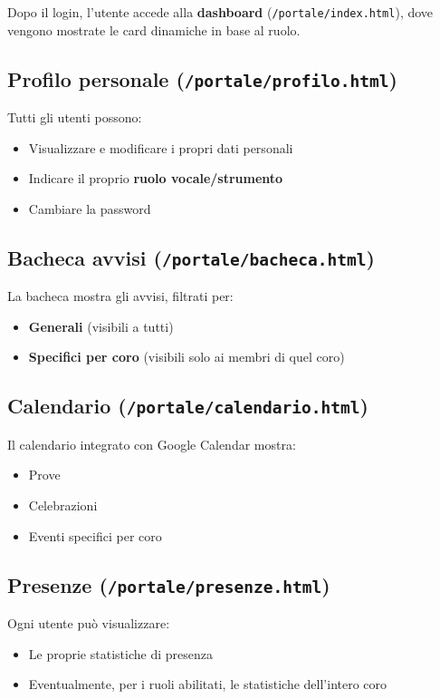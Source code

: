 \documentclass[a4paper,12pt]{article}
\begin{document}
	Dopo il login, l'utente accede alla \textbf{dashboard} (\texttt{/portale/index.html}), dove vengono mostrate le card dinamiche in base al ruolo.
	
	\subsection{Profilo personale (\texttt{/portale/profilo.html})}
	
	Tutti gli utenti possono:
	\begin{itemize}
		\item Visualizzare e modificare i propri dati personali
		\item Indicare il proprio \textbf{ruolo vocale/strumento}
		\item Cambiare la password
	\end{itemize}
	
	\subsection{Bacheca avvisi (\texttt{/portale/bacheca.html})}
	
	La bacheca mostra gli avvisi, filtrati per:
	\begin{itemize}
		\item \textbf{Generali} (visibili a tutti)
		\item \textbf{Specifici per coro} (visibili solo ai membri di quel coro)
	\end{itemize}
	
	\subsection{Calendario (\texttt{/portale/calendario.html})}
	
	Il calendario integrato con Google Calendar mostra:
	\begin{itemize}
		\item Prove
		\item Celebrazioni
		\item Eventi specifici per coro
	\end{itemize}
	
	\subsection{Presenze (\texttt{/portale/presenze.html})}
	
	Ogni utente può visualizzare:
	\begin{itemize}
		\item Le proprie statistiche di presenza
		\item Eventualmente, per i ruoli abilitati, le statistiche dell'intero coro
	\end{itemize}
	
\end{document}
